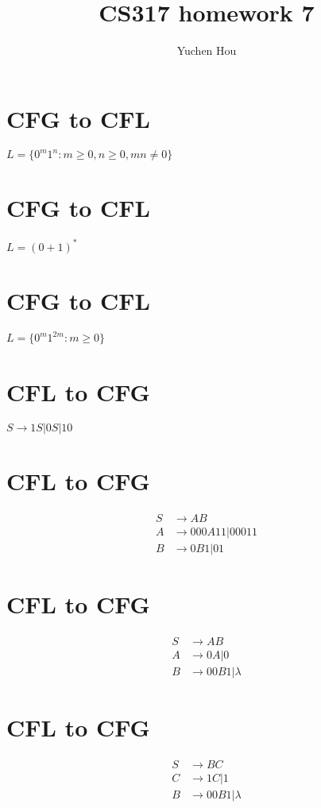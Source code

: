 \documentclass{article}
\begin{document}
\lstset{language=Java}
\title{CS317 homework 7}
\author{Yuchen Hou}
\maketitle

\section{CFG to CFL}
$L = \{0^m1^n: m \geq 0, n \geq 0, mn \neq 0\}$

\section{CFG to CFL}
$L = (0+1)^*$

\section{CFG to CFL}
$L = \{0^m1^{2m}: m \geq 0\}$

\section{CFL to CFG}
$S \to 1S | 0S |10$

\section{CFL to CFG}
\begin{align*}
S &\to AB\\
A &\to 000A11 | 00011\\
B &\to 0B1 | 01
\end{align*}

\section{CFL to CFG}
\begin{align*}
S &\to AB\\
A &\to 0A | 0\\
B &\to 00B1 | \lambda
\end{align*}

\section{CFL to CFG}
\begin{align*}
S &\to BC\\
C &\to 1C | 1\\
B &\to 00B1 | \lambda
\end{align*}
\end{document}
